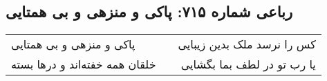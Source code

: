 \begin{center}
\section*{رباعی شماره ۷۱۵: پاکی و منزهی و بی همتایی}
\label{sec:sh715}
\begin{longtable}{l p{0.5cm} r}
پاکی و منزهی و بی همتایی
&&
کس را نرسد ملک بدین زیبایی
\\
خلقان همه خفته‌اند و درها بسته
&&
یا رب تو در لطف بما بگشایی
\\
\end{longtable}
\end{center}
